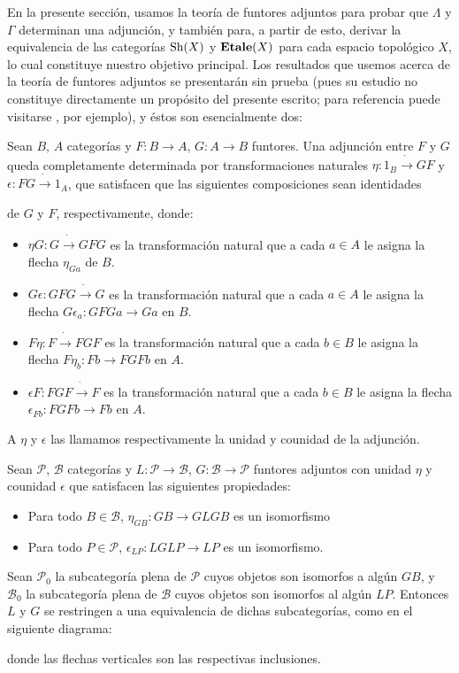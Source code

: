 En la presente sección, usamos la teoría de funtores adjuntos para probar que $\Lambda$ y $\Gamma$ determinan una adjunción, y también para, a partir de esto, derivar la equivalencia de las categorías $\normalfont{\text{Sh}}(X)$ y $\normalfont{\textbf{Etale}}(X)$ para cada espacio topológico $X$, lo cual constituye nuestro objetivo principal. Los resultados que usemos acerca de la teoría de funtores adjuntos se presentarán sin prueba (pues su estudio no constituye directamente un propósito del presente escrito; para referencia puede visitarse \cite[Chapter~4]{CWM}, por ejemplo), y éstos son esencialmente dos:
\begin{Tma}\label{Tma:TmaAdjuntos1}
   Sean $B$, $A$ categorías y $F:B\to A$, $G:A\to B$ funtores. Una adjunción entre $F$ y $G$ queda completamente determinada por transformaciones naturales $\eta:1_{B}\dot{\to}GF$ y $\epsilon:FG\dot{\to}1_{A}$, que satisfacen que las siguientes composiciones sean identidades
   
   de $G$ y $F$, respectivamente, donde: 
   \begin{itemize}
      \item $\eta G:G\dot{\to}GFG$ es la transformación natural que a cada $a\in A$ le asigna la flecha $\eta_{G a}$ de $B$.
      \item $G\epsilon :GFG\dot{\to}G$ es la transformación natural que a cada $a\in A$ le asigna la flecha $G\epsilon_{a}:GFGa\to Ga$ en $B$.
      \item $F \eta: F\dot{\to}FGF$ es la transformación natural que a cada $b\in B$ le asigna la flecha $F\eta_{b}:Fb\to FGFb$ en $A$.
      \item $\epsilon F:FGF\dot{\to}F$ es la transformación natural que a cada $b\in B$ le asigna la flecha $\epsilon_{Fb}:FGFb\to Fb$ en $A$. 
   \end{itemize}
   A $\eta$ y $\epsilon$ las llamamos respectivamente la unidad y counidad de la adjunción.
\end{Tma}
\begin{Lema}\label{Lema:LemaAdjuntos}
   Sean $\mathcal{P}$, $\mathcal{B}$ categorías y $L:\mathcal{P}\to \mathcal{B}$, $G:\mathcal{B}\to \mathcal{P}$ funtores adjuntos con unidad $\eta$ y counidad $\epsilon$ que satisfacen las siguientes propiedades:
   \begin{itemize}
      \item[\textbf{\text{(L1)}}] Para todo $B\in \mathcal{B}$, $\eta_{GB}:GB\to GLGB$ es un isomorfismo
      \item[\textbf{\text{(L2)}}] Para todo $P\in \mathcal{P}$, $\epsilon_{LP}:LGLP\to LP$ es un isomorfismo.
   \end{itemize}
   Sean $\mathcal{P}_{0}$ la subcategoría plena de $\mathcal{P}$ cuyos objetos son isomorfos a algún $GB$, y $\mathcal{B}_{0}$ la subcategoría plena de $\mathcal{B}$ cuyos objetos son isomorfos al algún $LP$. Entonces $L$ y $G$ se restringen a una equivalencia de dichas subcategorías, como en el siguiente diagrama:
   
   donde las flechas verticales son las respectivas inclusiones.
\end{Lema}
